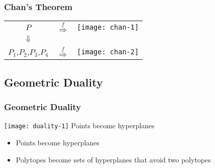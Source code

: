 \documentclass{beamer}
\begin{document}
\frame
{
   \frametitle{Chan's Theorem}

   \begin{tabular}{ccc}
    $P$ & $\stackrel{f}{\Rightarrow}$ & \texttt{[image: chan-1]} \\
    $\Downarrow$ \\
    $P_1$,$P_2$,$P_3$,$P_4$ & $\stackrel{f}{\Rightarrow}$ 
	& \texttt{[image: chan-2]} \\
   \end{tabular}
}

\subsection{Geometric Duality}
\frame
{ \frametitle{Geometric Duality}
  \begin{center}
   \texttt{[image: duality-1]}
   Points become hyperplanes
  \end{center}
  \begin{itemize}
    \item Points become hyperplanes
    \item Polytopes become sets of hyperplanes that avoid two polytopes
  \end{itemize}
}
\end{document}
